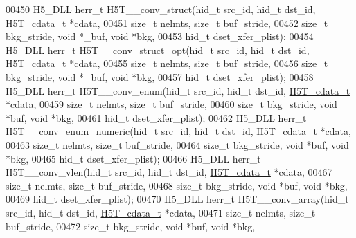 \begin{DoxyCode}
00450 H5\_DLL herr\_t H5T\_\_conv\_struct(hid\_t src\_id, hid\_t dst\_id, \hyperlink{struct_h5_t__cdata__t}{H5T\_cdata\_t} *cdata,
00451                 \textcolor{keywordtype}{size\_t} nelmts, \textcolor{keywordtype}{size\_t} buf\_stride,
00452                             \textcolor{keywordtype}{size\_t} bkg\_stride, \textcolor{keywordtype}{void} *\_buf, \textcolor{keywordtype}{void} *bkg,
00453                             hid\_t dset\_xfer\_plist);
00454 H5\_DLL herr\_t H5T\_\_conv\_struct\_opt(hid\_t src\_id, hid\_t dst\_id, \hyperlink{struct_h5_t__cdata__t}{H5T\_cdata\_t} *cdata,
00455                             \textcolor{keywordtype}{size\_t} nelmts, \textcolor{keywordtype}{size\_t} buf\_stride,
00456                             \textcolor{keywordtype}{size\_t} bkg\_stride, \textcolor{keywordtype}{void} *\_buf, \textcolor{keywordtype}{void} *bkg,
00457                             hid\_t dset\_xfer\_plist);
00458 H5\_DLL herr\_t H5T\_\_conv\_enum(hid\_t src\_id, hid\_t dst\_id, \hyperlink{struct_h5_t__cdata__t}{H5T\_cdata\_t} *cdata,
00459                 \textcolor{keywordtype}{size\_t} nelmts, \textcolor{keywordtype}{size\_t} buf\_stride,
00460                             \textcolor{keywordtype}{size\_t} bkg\_stride, \textcolor{keywordtype}{void} *buf, \textcolor{keywordtype}{void} *bkg,
00461                             hid\_t dset\_xfer\_plist);
00462 H5\_DLL herr\_t H5T\_\_conv\_enum\_numeric(hid\_t src\_id, hid\_t dst\_id, \hyperlink{struct_h5_t__cdata__t}{H5T\_cdata\_t} *cdata,
00463                 \textcolor{keywordtype}{size\_t} nelmts, \textcolor{keywordtype}{size\_t} buf\_stride,
00464                             \textcolor{keywordtype}{size\_t} bkg\_stride, \textcolor{keywordtype}{void} *buf, \textcolor{keywordtype}{void} *bkg,
00465                             hid\_t dset\_xfer\_plist);
00466 H5\_DLL herr\_t H5T\_\_conv\_vlen(hid\_t src\_id, hid\_t dst\_id, \hyperlink{struct_h5_t__cdata__t}{H5T\_cdata\_t} *cdata,
00467                 \textcolor{keywordtype}{size\_t} nelmts, \textcolor{keywordtype}{size\_t} buf\_stride,
00468                             \textcolor{keywordtype}{size\_t} bkg\_stride, \textcolor{keywordtype}{void} *buf, \textcolor{keywordtype}{void} *bkg,
00469                             hid\_t dset\_xfer\_plist);
00470 H5\_DLL herr\_t H5T\_\_conv\_array(hid\_t src\_id, hid\_t dst\_id, \hyperlink{struct_h5_t__cdata__t}{H5T\_cdata\_t} *cdata,
00471                 \textcolor{keywordtype}{size\_t} nelmts, \textcolor{keywordtype}{size\_t} buf\_stride,
00472                             \textcolor{keywordtype}{size\_t} bkg\_stride, \textcolor{keywordtype}{void} *buf, \textcolor{keywordtype}{void} *bkg,

\end{DoxyCode}
